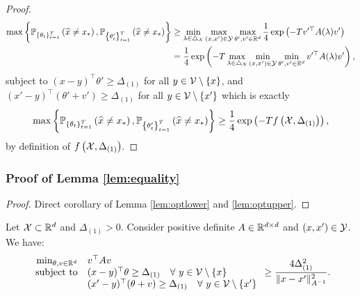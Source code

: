 \begin{proof}
\begin{align*}
    \max\left\{\mathbb{P}_{\left\{\theta_t\right\}_{t=1}^{T}}\left(\widehat{x}\neq x_*\right), \mathbb{P}_{\left\{\theta'_t\right\}_{t=1}^{T}}\left(\widehat{x}\neq x_*\right)\right\} &\geq \min_{\lambda \in \triangle_{\mathcal{X}}}\max_{(x,x') \in \mathcal{Y}}\max_{\theta',v' \in \mathbb{R}^d}\frac{1}{4} \exp \left(-  Tv'^\top A(\lambda)v' \right) \\
    &= \frac{1}{4} \exp \left(- T \max_{\lambda \in \triangle_{\mathcal{X}}}\min_{(x,x') \in \mathcal{Y}}\min_{\theta',v' \in \mathbb{R}^d} v'^\top A(\lambda)v'\right),
\end{align*}
subject to $(x - y)^\top\theta' \geq \Delta_{(1)}$ for all $y \in \mathcal{V} \setminus \{x\}$, and $ (x' - y)^\top(\theta' + v') \geq \Delta_{(1)}$ for all $y \in \mathcal{V} \setminus \{x'\}$ which is exactly \begin{equation}\max\left\{\mathbb{P}_{\left\{\theta_t\right\}_{t=1}^{T}}\left(\widehat{x}\neq x_*\right), \mathbb{P}_{\left\{\theta'_t\right\}_{t=1}^{T}}\left(\widehat{x}\neq x_*\right)\right\} \geq \frac{1}{4} \exp \left(- T f\left(\mathcal{X}, \Delta_{(1)}\right) \right),\end{equation}
by definition of $f\left(\mathcal{X}, \Delta_{(1)}\right)$.
\end{proof}

\subsubsection{Proof of Lemma \ref{lem:equality}}

\begin{proof}
    Direct corollary of 
    Lemma \ref{lem:optlower} and \ref{lem:optupper}.
\end{proof}

\begin{lemma} \label{lem:optlower}
Let $\mathcal{X} \subset \mathbb{R}^d$ and $\Delta_{(1)} > 0$. Consider positive definite $A \in \mathbb{R}^{d\times d}$ and $(x,x') \in \mathcal{Y}$. We have:
    \begin{equation}\begin{array}{rl}
    \min_{\theta, v\in\mathbb{R}^d} & v^\top Av \\
    \mbox{\rm subject to} & (x - y)^\top\theta\geq \Delta_{(1)} \quad\forall~y \in \mathcal{V} \setminus \{x\}\\
    & (x' - y)^\top(\theta + v)\geq \Delta_{(1)}\quad\forall~ y \in \mathcal{V} \setminus \{x'\}
\end{array} \geq \frac{4\Delta_{(1)}^2}{\|x - x'\|^2_{A^{-1}}}.\end{equation}
\end{lemma}

